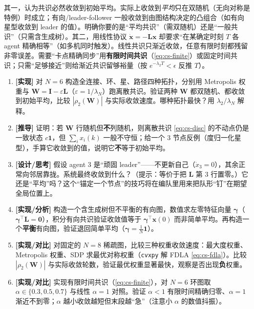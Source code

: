 \begin{pitfall}
其一，认为共识必然收敛到初始平均。实际上收敛到\emph{平均}只在双随机（无向对称是特例）时成立；有向/leader-follower 一般收敛到由图结构决定的凸组合（如有向星型收敛到 leader 的值）。明确你要的是“平均共识”（需双随机）还是“一般共识”（只需含生成树）。其二，用线性协议 $\dot{\mathbf{x}}=-\mathbf{L}\mathbf{x}$ 却要求“在某确定时刻 $T$ 各 agent 精确相等”（如多机同时触发）。线性共识只渐近收敛，任意有限时刻都残留非零误差。需要“卡点精确同步”用\textbf{有限时间共识}（\cref{eq:cs-finite}）或固定时间共识；只需“足够接近”则给渐近共识留够裕量（按 $e^{-\lambda_2 T}<\epsilon$ 反推 $T$）。
\end{pitfall}

\begin{practice}
\begin{enumerate}
  \item \textbf{[实现]} 对 $N=6$ 构造全连接、环、星、路径四种拓扑，分别用 Metropolis 权重与 $\mathbf{W}=\mathbf{I}-\varepsilon\mathbf{L}$（$\varepsilon=1/\lambda_N$）跑离散共识。验证两种 $\mathbf{W}$ 都双随机、都收敛到初始平均，比较 $|\rho_2(\mathbf{W})|$ 与实际收敛速度。哪种拓扑最快？用 $\lambda_2/\lambda_N$ 解释。
  \item \textbf{[推导]} 证明：若 $\mathbf{W}$ 行随机但\textbf{不}列随机，则离散共识 \cref{eq:cs-disc} 的不动点仍是一致状态 $c\mathbf{1}$，但 $\sum_i x_i(k)$ 一般不守恒；给一个 3 节点反例（度归一化星型），手算它收敛到的值，说明它\textbf{不}等于初始平均。
  \item \textbf{[设计/思考]} 假设 agent 3 是“顽固 leader”——不更新自己（$\dot x_3=0$），其余正常向邻居靠拢。系统最终收敛到什么？（提示：等价于把 $\mathbf{L}$ 第 3 行置零。）它还是“平均”吗？这个“锚定一个节点”的技巧将在编队里用来把队形“钉”在期望全局位置上。
  \item \textbf{[实现/分析]} 构造一个含生成树但不平衡的有向图，数值求左零特征向量 $\boldsymbol{\gamma}$（$\boldsymbol{\gamma}^\top\mathbf{L}=\mathbf{0}$），积分有向共识验证收敛值等于 $\boldsymbol{\gamma}^\top\mathbf{x}(0)$ 而非简单平均。再构造一个\textbf{平衡}有向图，验证退回简单平均（$\boldsymbol{\gamma}=\tfrac1N\mathbf{1}$）。
  \item \textbf{[实现/对比]} 对固定的 $N=8$ 稀疏图，比较三种权重收敛速度：最大度权重、Metropolis 权重、SDP 求最优对称权重（\verb|cvxpy| 解 FDLA \cref{eq:cs-fdla}）。比较 $|\rho_2(\mathbf{W})|$ 与实际收敛轮数，验证最优权重显著最快，观察是否出现\textbf{负}权重。
  \item \textbf{[实现/对比]} 实现有限时间共识（\cref{eq:cs-finite}），对 $N=6$ 环图取 $\alpha\in\{0.3,0.5,0.7\}$ 与线性 $\alpha=1$ 对照。验证 $\alpha<1$ 有限时间精确归零、$\alpha=1$ 渐近不到零；$\alpha$ 越小收敛越短但末段越“急”（注意小 $\alpha$ 的数值抖振）。
\end{enumerate}
\end{practice}

